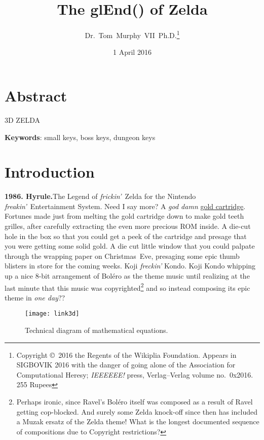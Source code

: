\documentclass[twocolumn]{article}
\begin{document}
 

\title{The glEnd() of Zelda}
\author{Dr.~Tom~Murphy~VII~Ph.D.\thanks{
    Copyright \copyright\ 2016 the Regents of the Wikiplia Foundation.
    Appears in SIGBOVIK 2016 with the danger of going alone of the
    Association for Computational Heresy; {\em IEEEEEE!} press,
    Verlag--Verlag volume no.~0x2016. 255 Rupees} }

\renewcommand\>{$>$}
\newcommand\<{$<$}

\date{1 April 2016}

\maketitle

\section*{Abstract}
3D ZELDA

\vspace{1em}
{\noindent \small {\bf Keywords}:
  small keys, boss keys, dungeon keys
}

\section{Introduction}

{\bf 1986. Hyrule.}\quad The Legend of {\it frickin'}~Zelda for the
Nintendo {\it freakin'}~Entertainment System. Need I say more? A {\it
  god damn} \uline{gold cartridge}. Fortunes made just from melting
the gold cartridge down to make gold teeth grilles, after carefully
extracting the even more precious ROM inside. A die-cut hole in the
box so that you could get a peek of the cartridge and presage that you
were getting some solid gold. A die cut little window that you could
palpate through the wrapping paper on Christmas~Eve, presaging some
epic thumb blisters in store for the coming weeks. Koji {\it freckin'}
Kondo. Koji Kondo whipping up a nice 8-bit arrangement of Bol\'ero as
the theme music until realizing at the last minute that this music was
copyrighted\footnote{Perhaps ironic, since Ravel's {Bol\'ero} itself
  was composed as a result of Ravel getting
  cop-blocked.\cite{wikipedia2016bolero} And surely some Zelda
  knock-off since then has included a Muzak ersatz of the Zelda theme!
  What is the longest documented sequence of compositions due to
  Copyright restrictions?} and so instead composing its epic theme in
{\it one day}??

\begin{figure}[ht]
\begin{center}
\texttt{[image: link3d]}
\end{center}\vspace{-0.1in}
\caption{Technical diagram of mathematical equations.} \label{fig:link3d}
\end{figure}
\end{document}
